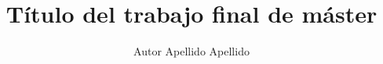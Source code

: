 \documentclass[a4paper,12pt,twoside,hidelinks,openright,openany]{report}
\begin{document}
\title{Título del trabajo final de máster}
\author{Autor Apellido Apellido}

\pagebreak
\cleardoublepage
\baselineskip 19pt

\renewcommand{\labelitemi}{$-$}
\renewcommand{\tablename}{Tabla}

\renewcommand{\appendixname}{Anexos}
\renewcommand{\appendixtocname}{Anexos}
\renewcommand{\appendixpagename}{Anexos}





\cleardoublepage



\newpage


\newpage

\newpage

\renewcommand{\contentsname}{Tabla de contenidos}
\tableofcontents












\nocite{*} 

\printglossaries

\newpage
\renewcommand\listfigurename{Lista de Figuras}
\listoffigures

\newpage
\renewcommand\listtablename{Lista de Tablas}
\listoftables


\newpage
\appendix
\clearpage
\addappheadtotoc
\appendixpage








		
\end{document}
